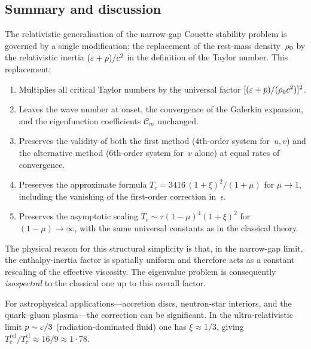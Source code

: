 \subsection{Summary and discussion}\label{sec:rel-71-summary}

The relativistic generalisation of the narrow-gap Couette stability
problem is governed by a single modification: the replacement of the
rest-mass density~$\rho_0$ by the relativistic inertia
$(\varepsilon + p)/c^{2}$ in the definition of the Taylor number.
This replacement:

\begin{enumerate}
\item Multiplies all critical Taylor numbers by the universal
  factor $[(\varepsilon+p)/(\rho_0 c^{2})]^{2}$.

\item Leaves the wave number at onset, the convergence of the
  Galerkin expansion, and the eigenfunction coefficients
  $\mathscr{C}_{m}$ unchanged.

\item Preserves the validity of both the first method (4th-order
  system for~$u,v$) and the alternative method (6th-order system
  for~$v$ alone) at equal rates of convergence.

\item Preserves the approximate formula
  $T_{c} = 3416\,(1+\xi)^{2}/(1+\mu)$ for $\mu \to 1$, including
  the vanishing of the first-order correction in~$\epsilon$.

\item Preserves the asymptotic scaling
  $T_{c} \sim \tau(1-\mu)^{4}(1+\xi)^{2}$ for
  $(1-\mu) \to \infty$, with the same universal constants as in
  the classical theory.
\end{enumerate}

The physical reason for this structural simplicity is that, in the
narrow-gap limit, the enthalpy-inertia factor is spatially uniform
and therefore acts as a constant rescaling of the effective
viscosity.  The eigenvalue problem is consequently \emph{isospectral}
to the classical one up to this overall factor.

For astrophysical applications---accretion discs, neutron-star
interiors, and the quark--gluon plasma---the correction can be
significant.  In the ultra-relativistic limit
$p \sim \varepsilon/3$ (radiation-dominated fluid) one has
$\xi \approx 1/3$, giving
$T_{c}^{\mathrm{rel}}/T_{c}^{\mathrm{cl}} \approx 16/9 \approx
1{\cdot}78$.

